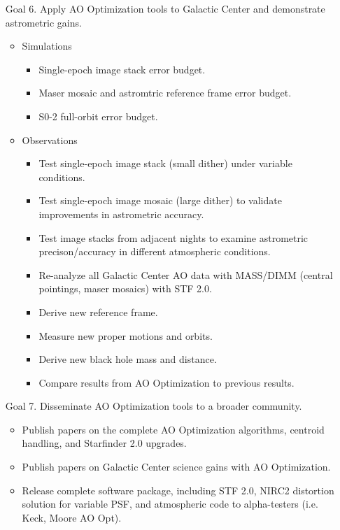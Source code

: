 \begin{enumerate}
\item[Goal 6.] Apply AO Optimization tools to Galactic Center and demonstrate
  astrometric gains.
  \begin{itemize}
  \item Simulations
    \begin{itemize}
    \item Single-epoch image stack error budget.
    \item Maser mosaic and astromtric reference frame error budget.
    \item S0-2 full-orbit error budget.
    \end{itemize}
  \item Observations
    \begin{itemize}
    \item Test single-epoch image stack (small dither) under variable
      conditions. 
    \item Test single-epoch image mosaic (large dither) to validate
      improvements in astrometric accuracy. 
    \item Test image stacks from adjacent nights to examine
      astrometric precison/accuracy in different atmospheric conditions.
    \item Re-analyze all Galactic Center AO data with MASS/DIMM
      (central pointings, maser mosaics) with STF 2.0.
    \item Derive new reference frame.
    \item Measure new proper motions and orbits.
    \item Derive new black hole mass and distance.
    \item Compare results from AO Optimization to previous results.
    \end{itemize}
  \end{itemize}

\item[Goal 7.] Disseminate AO Optimization tools to a broader
  community.
  \begin{itemize}
  \item Publish papers on the complete AO Optimization algorithms,
    centroid handling, and Starfinder 2.0 upgrades. 
  \item Publish papers on Galactic Center science gains with AO Optimization.
  \item Release complete software package, including STF 2.0, NIRC2
    distortion solution for variable PSF, and atmospheric code to
    alpha-testers (i.e. Keck, Moore AO Opt).
  \end{itemize}
\end{enumerate}
